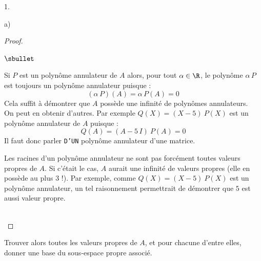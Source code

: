\begin{noliste}{1.}
\begin{noliste}{a)}
\begin{proof}
\begin{remark}
\begin{noliste}{$\sbullet$}
        \item Si $P$ est un polynôme annulateur de $A$ alors, pour
          tout $\alpha \in \R$, le polynôme $\alpha \, P$ est toujours
          un polynôme annulateur puisque :
          \[
          (\alpha \, P)(A) = \alpha \, P(A) = 0
          \]
          Cela suffit à démontrer que $A$ possède une infinité de
          polynômes annulateurs. \\
          On peut en obtenir d'autres. Par exemple $Q(X) = (X-5) \
          P(X)$ est un polynôme annulateur de $A$ puisque :
          \[
          Q(A) = (A - 5 \, I) \ P(A) = 0
          \]
          Il faut donc parler {\tt D'UN} polynôme annulateur d'une
          matrice.
          
        \item Les racines d'un polynôme annulateur ne sont pas forcément
          toutes valeurs propres de $A$. Si c'était le cas, $A$ aurait
          une infinité de valeurs propres (elle en possède au plus $3$
          !). Par exemple, comme $Q(X) = (X-5) \ P(X)$ est un polynôme
          annulateur, un tel raisonnement permettrait de démontrer que
          $5$ est aussi valeur propre.
          
        \end{noliste}
      \end{remark}~\\[-1.4cm]
    \end{proof}


    \newpage


  \item Trouver alors toutes les valeurs propres de $A$, et pour
    chacune d'entre elles, donner une base du sous-espace propre
    associé.


\end{noliste}
\end{noliste}
